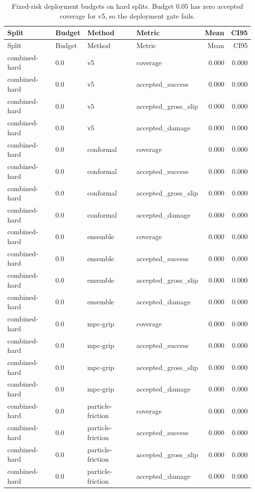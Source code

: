 \documentclass{article}
\begin{document}
\begin{longtable}{@{}ll llrr@{}}
\caption{Fixed-risk deployment budgets on hard splits. Budget 0.05 has zero accepted coverage for v5, so the deployment gate fails.}\\
\toprule
Split & Budget & Method & Metric & Mean & CI95 \\
\midrule
\endfirsthead
\toprule
Split & Budget & Method & Metric & Mean & CI95 \\
\midrule
\endhead
combined-hard & 0.0 & v5 & coverage & 0.000 & 0.000 \\
combined-hard & 0.0 & v5 & accepted\_success & 0.000 & 0.000 \\
combined-hard & 0.0 & v5 & accepted\_gross\_slip & 0.000 & 0.000 \\
combined-hard & 0.0 & v5 & accepted\_damage & 0.000 & 0.000 \\
combined-hard & 0.0 & conformal & coverage & 0.000 & 0.000 \\
combined-hard & 0.0 & conformal & accepted\_success & 0.000 & 0.000 \\
combined-hard & 0.0 & conformal & accepted\_gross\_slip & 0.000 & 0.000 \\
combined-hard & 0.0 & conformal & accepted\_damage & 0.000 & 0.000 \\
combined-hard & 0.0 & ensemble & coverage & 0.000 & 0.000 \\
combined-hard & 0.0 & ensemble & accepted\_success & 0.000 & 0.000 \\
combined-hard & 0.0 & ensemble & accepted\_gross\_slip & 0.000 & 0.000 \\
combined-hard & 0.0 & ensemble & accepted\_damage & 0.000 & 0.000 \\
combined-hard & 0.0 & mpc-grip & coverage & 0.000 & 0.000 \\
combined-hard & 0.0 & mpc-grip & accepted\_success & 0.000 & 0.000 \\
combined-hard & 0.0 & mpc-grip & accepted\_gross\_slip & 0.000 & 0.000 \\
combined-hard & 0.0 & mpc-grip & accepted\_damage & 0.000 & 0.000 \\
combined-hard & 0.0 & particle-friction & coverage & 0.000 & 0.000 \\
combined-hard & 0.0 & particle-friction & accepted\_success & 0.000 & 0.000 \\
combined-hard & 0.0 & particle-friction & accepted\_gross\_slip & 0.000 & 0.000 \\
combined-hard & 0.0 & particle-friction & accepted\_damage & 0.000 & 0.000 \\

\end{longtable}
\end{document}
